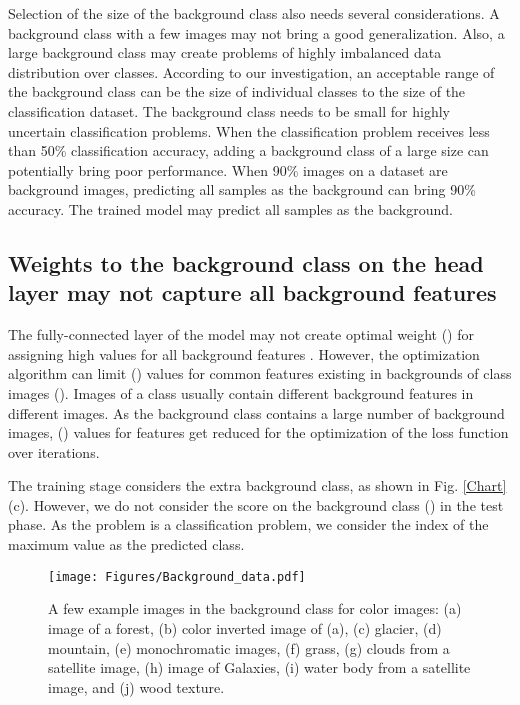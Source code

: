 \documentclass{article}
\begin{document}
Selection of the size of the background class also needs several considerations. A background class with a few images may not bring a good generalization. Also, a large background class may create problems of highly imbalanced data distribution over classes. According to our investigation, an acceptable range of the background class can be the size of individual classes to the size of the classification dataset. The background class needs to be small for highly uncertain classification problems. When the classification problem receives less than 50\% classification accuracy, adding a background class of a large size can potentially bring poor performance. When 90\% images on a dataset are background images, predicting all samples as the background can bring 90\% accuracy. The trained model may predict all samples as the background. 


\subsection{Weights to the background class on the head layer may not capture all background features}
The fully-connected layer of the model may not create optimal weight () for assigning high values for all background features . However, the optimization algorithm can limit () values for common features existing in backgrounds of class images (). Images of a class usually contain different background features  in different images. As the background class contains a large number of background images, () values for features  get reduced for the optimization of the loss function over iterations.

The training stage considers the extra background class, as shown in Fig. \ref{Chart}(c). However, we do not consider the score on the background class () in the test phase. As the problem is a classification problem, we consider the index of the maximum  value as the predicted class. 

 
\begin{figure*}
\vskip 0.2in
\begin{center}
\centerline{\texttt{[image: Figures/Background\_data.pdf]}}
\caption{A few example images in the background class for color images: (a) image of a forest, (b) color inverted image of (a), (c) glacier, (d) mountain, (e) monochromatic images, (f) grass, (g) clouds from a satellite image, (h) image of Galaxies, (i) water body from a satellite image, and (j) wood texture. }
\label{Background}
\end{center}
\vskip -0.2in
\end{figure*}
\end{document}
